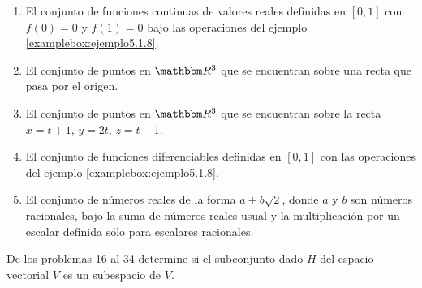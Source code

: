 \begin{enumerate}
    \item El conjunto de funciones continuas de valores reales definidas en $[0, 1]$ con $f(0) = 0$ y $f(1) = 0$ bajo las operaciones del ejemplo \ref{examplebox:ejemplo5.1.8}.
    \item El conjunto de puntos en $\RR[3]$ que se encuentran sobre una recta que pasa por el origen.
    \item El conjunto de puntos en $\RR[3]$ que se encuentran sobre la recta $x = t+1$, $y = 2t$, $z = t-1$.
    \item El conjunto de funciones diferenciables definidas en $[0, 1]$ con las operaciones del ejemplo \ref{examplebox:ejemplo5.1.8}.
    \item El conjunto de números reales de la forma $a+b \sqrt{2}$, donde $a$ y $b$ son números racionales, bajo la suma de números reales usual y la multiplicación por un escalar definida sólo para escalares racionales.
\end{enumerate}
De los problemas 16 al 34 determine si el subconjunto dado $H$ del espacio vectorial $V$ es un subespacio de $V$.

